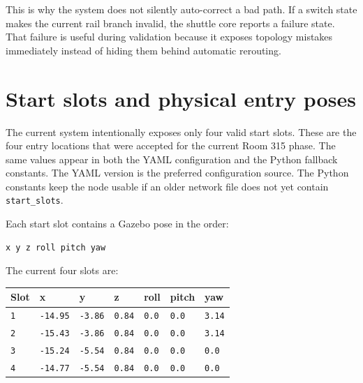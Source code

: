 \documentclass[12pt,a4paper]{report}
\newcommand{\codenext}[1]{\par\Needspace{#1\baselineskip}}
\begin{document}
This is why the system does not silently auto-correct a bad path. If a switch
state makes the current rail branch invalid, the shuttle core reports a failure
state. That failure is useful during validation because it exposes topology
mistakes immediately instead of hiding them behind automatic rerouting.

\section{Start slots and physical entry poses}

The current system intentionally exposes only four valid start slots. These are
the four entry locations that were accepted for the current Room 315 phase.
The same values appear in both the YAML configuration and the Python fallback
constants. The YAML version is the preferred configuration source. The Python
constants keep the node usable if an older network file does not yet contain
\texttt{start\_slots}.

\codenext{28}


Each start slot contains a Gazebo pose in the order:

\begin{lstlisting}[style=terminalcode]
x y z roll pitch yaw
\end{lstlisting}

The current four slots are:

\begin{longtable}{@{}lllllll@{}}
\toprule
Slot & x & y & z & roll & pitch & yaw \\
\midrule
\endhead
\texttt{1} & \texttt{-14.95} & \texttt{-3.86} & \texttt{0.84} & \texttt{0.0} & \texttt{0.0} & \texttt{3.14} \\
\texttt{2} & \texttt{-15.43} & \texttt{-3.86} & \texttt{0.84} & \texttt{0.0} & \texttt{0.0} & \texttt{3.14} \\
\texttt{3} & \texttt{-15.24} & \texttt{-5.54} & \texttt{0.84} & \texttt{0.0} & \texttt{0.0} & \texttt{0.0} \\
\texttt{4} & \texttt{-14.77} & \texttt{-5.54} & \texttt{0.84} & \texttt{0.0} & \texttt{0.0} & \texttt{0.0} \\
\bottomrule
\end{longtable}
\end{document}
